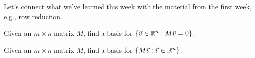 \documentclass{homework}
\begin{document}
Let's connect what we've learned this week with the material from
the first week, e.g., row reduction.

\begin{problem}
  Given an $m \times n$ matrix $M$, find a basis for
  $\{ \vec{v} \in \mathbb{R}^n : M \vec{v} = 0 \}$.
\end{problem}

\vfill

\begin{problem}
  Given an $m \times n$ matrix $M$, find a basis for
  $\{ M \vec{v} : \vec{v} \in \mathbb{R}^n \}$.
\end{problem}

\vfill
\end{document}
